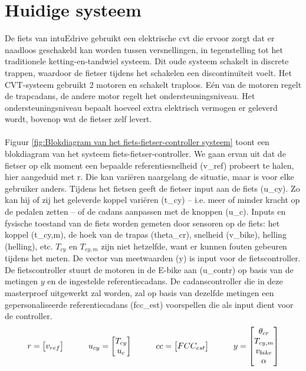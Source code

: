 \section{Huidige systeem}
De fiets van intuEdrive gebruikt een elektrische \gls{cvt} die ervoor zorgt dat er naadloos geschakeld kan worden tussen versnellingen, in tegenstelling tot het traditionele ketting-en-tandwiel systeem. Dit oude systeem schakelt in discrete trappen, waardoor de fietser tijdens het schakelen een discontinuïteit voelt. Het CVT-systeem gebruikt 2 motoren en schakelt traploos. Eén van de motoren regelt de trapcadans, de andere motor regelt het ondersteuningsniveau. Het ondersteuningsniveau bepaalt hoeveel extra elektrisch vermogen er geleverd wordt, bovenop wat de fietser zelf levert.
\\\\
Figuur \ref{fig:Blokdiagram van het fiets-fietser-controller systeem} toont een blokdiagram van het systeem fiets-fietser-controller. We gaan ervan uit dat de fietser op elk moment een bepaalde referentiesnelheid (\gls{v_ref}) probeert te halen, hier aangeduid met \gls{r}. Die kan variëren naargelang de situatie, maar is voor elke gebruiker anders. Tijdens het fietsen geeft de fietser input aan de fiets (\gls{u_cy}). Zo kan hij of zij het geleverde koppel variëren (\gls{t_cy}) – i.e. meer of minder kracht op de pedalen zetten – of de cadans aanpassen met de knoppen (\gls{u_c}). Inputs en fysische toestand van de fiets worden gemeten door sensoren op de fiets: het koppel (\gls{t_cy,m}), de hoek van de trapas (\gls{theta_cr}), snelheid (\gls{v_bike}), helling (\gls{helling}), etc. $T_{cy}$ en $T_{cy,m}$ zijn niet hetzelfde, want er kunnen fouten gebeuren tijdens het meten. De vector van meetwaarden (\gls{y}) is input voor de fietscontroller. De fietscontroller stuurt de motoren in de E-bike aan (\gls{u_contr}) op basis van de metingen $y$ en de ingestelde referentiecadans. De cadanscontroller die in deze masterproef uitgewerkt zal worden, zal op basis van dezelfde metingen een gepersonaliseerde referentiecadans (\gls{fcc_est}) voorspellen die als input dient voor de controller.
\begin{gather*}
r = \begin{bmatrix}
       v_{ref}  
     \end{bmatrix} \hspace*{1cm}
u_{cy} = \begin{bmatrix}
       T_{cy} \\ u_c  
     \end{bmatrix} \hspace*{1cm}
cc = \begin{bmatrix}
       FCC_{est}  
     \end{bmatrix} \hspace*{1cm}
y = \begin{bmatrix} 
       \theta _{cr} \\ T_{cy,m} \\ v_{bike} \\ \alpha
     \end{bmatrix} 
\end{gather*}
